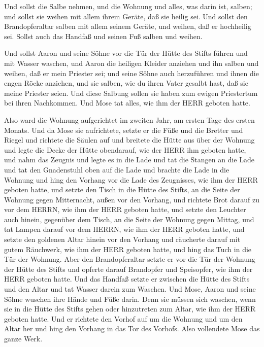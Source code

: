  Und sollst die Salbe nehmen, und die Wohnung und alles, was
darin ist, salben; und sollst sie weihen mit allem ihrem Geräte, daß sie
heilig sei.  Und sollst den Brandopferaltar salben mit
allem seinem Geräte, und weihen, daß er hochheilig sei. 
Sollst auch das Handfaß und seinen Fuß salben und weihen.

 Und sollst Aaron und seine Söhne vor die Tür der Hütte des
Stifts führen und mit Wasser waschen,  und Aaron die
heiligen Kleider anziehen und ihn salben und weihen, daß er mein
Priester sei;  und seine Söhne auch herzuführen und ihnen
die engen Röcke anziehen,  und sie salben, wie du ihren
Vater gesalbt hast, daß sie meine Priester seien. Und diese Salbung
sollen sie haben zum ewigen Priestertum bei ihren Nachkommen.
 Und Mose tat alles, wie ihm der HERR geboten hatte.

 Also ward die Wohnung aufgerichtet im zweiten Jahr, am
ersten Tage des ersten Monats.  Und da Mose sie
aufrichtete, setzte er die Füße und die Bretter und Riegel und richtete
die Säulen auf  und breitete die Hütte aus über der Wohnung
und legte die Decke der Hütte obendarauf, wie der HERR ihm geboten
hatte,  und nahm das Zeugnis und legte es in die Lade und
tat die Stangen an die Lade und tat den Gnadenstuhl oben auf die Lade
 und brachte die Lade in die Wohnung und hing den Vorhang
vor die Lade des Zeugnisses, wie ihm der HERR geboten hatte,
 und setzte den Tisch in die Hütte des Stifts, an die Seite
der Wohnung gegen Mitternacht, außen vor den Vorhang,  und
richtete Brot darauf zu vor dem HERRN, wie ihm der HERR geboten hatte,
 und setzte den Leuchter auch hinein, gegenüber dem Tisch,
an die Seite der Wohnung gegen Mittag,  und tat Lampen
darauf vor dem HERRN, wie ihm der HERR geboten hatte,  und
setzte den goldenen Altar hinein vor den Vorhang  und
räucherte darauf mit gutem Räuchwerk, wie ihm der HERR geboten hatte,
 und hing das Tuch in die Tür der Wohnung. 
Aber den Brandopferaltar setzte er vor die Tür der Wohnung der Hütte des
Stifts und opferte darauf Brandopfer und Speisopfer, wie ihm der HERR
geboten hatte.  Und das Handfaß setzte er zwischen die
Hütte des Stifts und den Altar und tat Wasser darein zum Waschen.
 Und Mose, Aaron und seine Söhne wuschen ihre Hände und
Füße darin.  Denn sie müssen sich waschen, wenn sie in die
Hütte des Stifts gehen oder hinzutreten zum Altar, wie ihm der HERR
geboten hatte.  Und er richtete den Vorhof auf um die
Wohnung und um den Altar her und hing den Vorhang in das Tor des
Vorhofs. Also vollendete Mose das ganze Werk.

